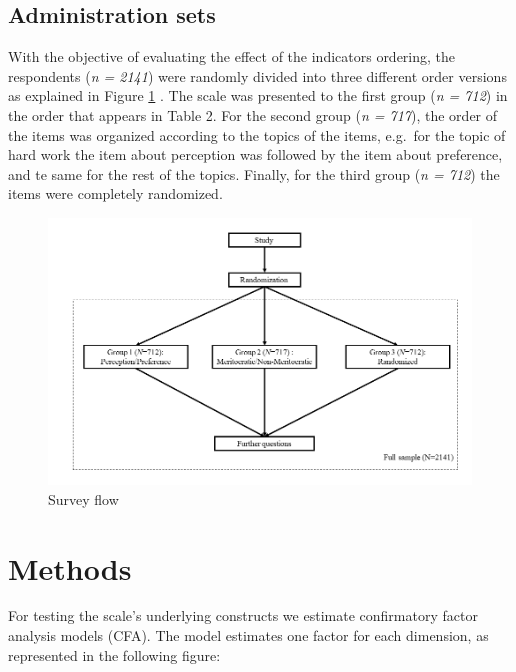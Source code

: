 \documentclass[
]{article}
\begin{document}
\pagebreak

\hypertarget{administration-sets}{%
\subsection{Administration sets}\label{administration-sets}}

With the objective of evaluating the effect of the indicators ordering, the respondents (\emph{n = 2141}) were randomly divided into three different order versions as explained in Figure \ref{fig:appmod} . The scale was presented to the first group (\emph{n = 712}) in the order that appears in Table 2. For the second group (\emph{n = 717}), the order of the items was organized according to the topics of the items, e.g.~for the topic of hard work the item about perception was followed by the item about preference, and te same for the rest of the topics. Finally, for the third group (\emph{n = 712}) the items were completely randomized.

\begin{figure}[H]

{\centering \includegraphics[width=0.75\linewidth]{../input/images/app_mod} 

}

\caption{Survey flow}\label{fig:appmod}
\end{figure}

\hypertarget{methods}{%
\section{Methods}\label{methods}}

For testing the scale's underlying constructs we estimate confirmatory factor analysis models (CFA). The model estimates one factor for each dimension, as represented in the following figure:
\end{document}
